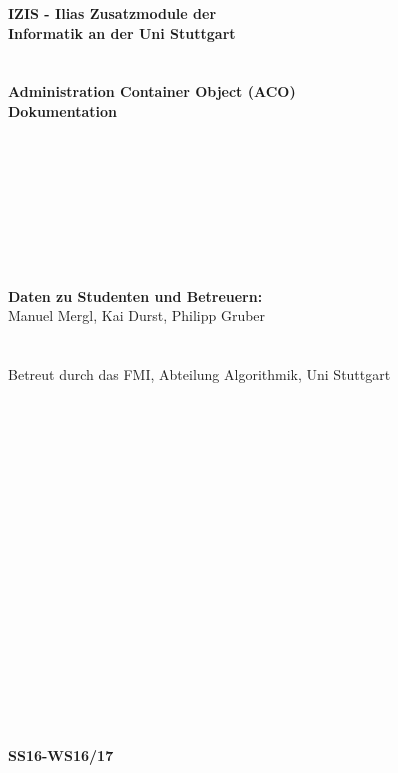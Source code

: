 
\begin{center}
	 \large\textbf{IZIS - Ilias Zusatzmodule der\\ Informatik an der Uni Stuttgart}
	 \\~\\~\\
	 \huge\textbf{Administration Container Object (ACO)\\Dokumentation}
\end{center}

~\\~\\~\\~\\~\\~\\~\\

\begin{center}
	\large\textbf{Daten zu Studenten und Betreuern:}\\
	Manuel Mergl, 
	Kai Durst, 
	Philipp Gruber
	\\~\\~\\
	Betreut durch das FMI, Abteilung Algorithmik, Uni Stuttgart
	
	
\end{center}
	
~\\~\\~\\~\\~\\~\\~\\~\\~\\~\\~\\~\\~\\~\\~\\~\\~\\			
	 		
\begin{center}
	 \textbf{SS16-WS16/17}
\end{center}
	
	
 